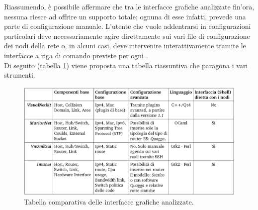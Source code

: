 Riassumendo, è possibile affermare che tra le interfacce grafiche analizzate fin'ora, nessuna riesce ad offrire un supporto totale; ognuna di esse infatti, prevede una parte di configurazione manuale. L'utente che vuole addentrarsi in configurazioni particolari deve necessariamente agire direttamente sui vari file di configurazione dei nodi della rete o, in alcuni casi, deve intervenire interattivamente tramite le interfacce a riga di comando previste per ogni \virtualmachine{}. \\
Di seguito (tabella \ref{figura:gui_compare}) viene proposta una tabella riassuntiva che paragona i vari strumenti.

\begin{figure}[!htb]
	\centering
	\includegraphics[width=12.7cm]{images/tabella_comparativa.png}
	\caption{Tabella comparativa delle interfacce grafiche analizzate.}
	\label{figura:gui_compare}
	
\end{figure}
